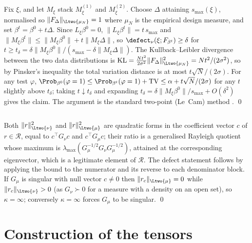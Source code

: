 \subsection*{}
Fix $\xi$, and let $M_\xi$ stack $M^{(1)}_\xi$ and $M^{(2)}_\xi$. Choose
$\Delta$ attaining $s_{\max}(\xi)$, normalised so
$\|F_\Delta\|_{\Ltwo{\mu_N}} = 1$ where $\mu_N$ is the empirical design measure,
and set $\beta^t = \beta^0 + t\Delta$. Since $L_\xi \beta^0 = 0$,
$\|L_\xi\beta^t\| = t\,s_{\max}$ and
$\|M_\xi \beta^t\| \le \|M_\xi\beta^0\| + t\|M_\xi\Delta\|$, so
$\defect_\nu(\xi;F_{\beta^t}) \ge \delta$ for
$t \ge t_\delta = \delta\|M_\xi\beta^0\|/(s_{\max}-\delta\|M_\xi\Delta\|)$.
The Kullback--Leibler divergence between the two data distributions is
$\mathrm{KL} = \tfrac{N t^2}{2\sigma^2}\|F_\Delta\|^2_{\Ltwo{\mu_N}}
= Nt^2/(2\sigma^2)$, so by Pinsker's inequality the total variation distance is
at most $t\sqrt N/(2\sigma)$. For any test $\varphi$,
$\Prob_{\beta^0}(\varphi=1) \le \Prob_{\beta^{t}}(\varphi=1) +
\mathrm{TV} \le \alpha + t\sqrt N/(2\sigma)$ for any $t$ slightly above
$t_\delta$; taking $t \downarrow t_\delta$ and expanding
$t_\delta = \delta\|M_\xi\beta^0\|/s_{\max} + O(\delta^2)$ gives the claim.
The argument is the standard two-point (Le~Cam) method
\citep[Ch.~2]{tsybakov2009introduction}. \qed

\subsection*{}
Both $\|r\|^2_{\Ltwo{\nu}}$ and $\|r\|^2_{\Ltwo{\mu}}$ are quadratic forms in
the coefficient vector $c$ of $r \in \mathcal R$, equal to $c^{\!\top}G_\nu c$
and $c^{\!\top}G_\mu c$; their ratio is a generalised Rayleigh quotient whose
maximum is $\lambda_{\max}(G_\mu^{-1/2}G_\nu G_\mu^{-1/2})$, attained at the
corresponding eigenvector, which is a legitimate element of $\mathcal R$. The
defect statement follows by applying the bound to the numerator and its reverse
to each denominator block. If $G_\mu$ is singular with null vector $c \ne 0$
then $\|r_c\|_{\Ltwo{\mu}} = 0$ while $\|r_c\|_{\Ltwo{\nu}}>0$ (as $G_\nu \succ
0$ for a measure with a density on an open set), so $\kappa = \infty$;
conversely $\kappa = \infty$ forces $G_\mu$ to be singular. \qed

\section{Construction of the tensors}
\label{app:construction}

